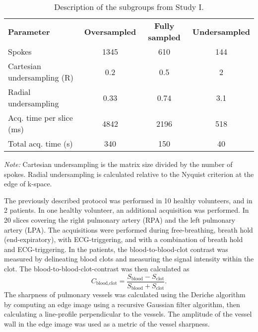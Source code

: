 \begin{table}[htbp]
\caption{Description of the subgroups from Study I.}
\begin{center}
\begin{threeparttable}
\begin{tabular}{l c c c}
     \mydarkrowcolor \textbf{Parameter} & \textbf{Oversampled} & \textbf{Fully sampled} & \textbf{Undersampled}\\
     Spokes & 1345 & 610 & 144 \\
     \myrowcolor Cartesian undersampling (R) & 0.2 & 0.5 & 2 \\
     Radial undersampling & 0.33 & 0.74 & 3.1 \\
     \myrowcolor Acq. time per slice (ms) & 4842 & 2196 & 518 \\ 
     Total acq. time (s) & 340 & 150 & 40 \\
     \bottomrule
\end{tabular}
\begin{tablenotes}
\emph{Note:} Cartesian undersampling is the matrix size divided by the number of spokes. Radial undersampling is calculated relative to the Nyquist criterion at the edge of k-space.
\end{tablenotes}
\end{threeparttable}
\end{center}
\label{table:study1subgroups}
\end{table}
The previously described protocol was performed in 10 healthy volunteers, and in 2 patients. In one healthy volunteer, an additional acquisition was performed. In 20 slices covering the right pulmonary artery (RPA) and the left pulmonary artery (LPA). The acquisitions were performed during free-breathing, breath hold (end-expiratory), with ECG-triggering, and with a combination of breath hold and ECG-triggering.
In the patients, the blood-to-blood-clot contrast was measured by delineating blood clots and measuring the signal intensity within the clot. The blood-to-blood-clot-contrast was then calculated as
\begin{equation}
    C_{\textrm{blood,clot}} = \frac{S_{\textrm{blood}} - S_{\textrm{clot}}}{S_{\textrm{blood}}+S_{\textrm{clot}}}.
    \label{eq:bloodclotcontrast}
\end{equation}
The sharpness of pulmonary vessels was calculated using the Deriche algorithm~\cite{Deriche1990} by computing an edge image using a recursive Gaussian filter algorithm, then calculating a line-profile perpendicular to the vessels. The amplitude of the vessel wall in the edge image was used as a metric of the vessel sharpness.

